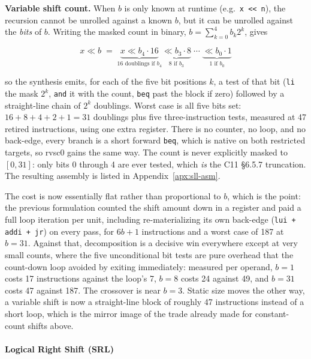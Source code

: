 \textbf{Variable shift count.} When $b$ is only known at runtime (e.g.\ \texttt{x << n}), the
recursion cannot be unrolled against a known $b$, but it can be unrolled against the \textit{bits}
of $b$. Writing the masked count in binary, $b = \sum_{k=0}^{4} b_k 2^k$, gives

\begin{equation*}
x \ll b \;=\;
  \underbrace{x \ll b_4 \cdot 16}_{\text{16 doublings if } b_4}
  \underbrace{\ll b_3 \cdot 8}_{\text{8 if } b_3}
  \;\cdots\;
  \underbrace{\ll b_0 \cdot 1}_{\text{1 if } b_0}
\end{equation*}

so the synthesis emits, for each of the five bit positions $k$, a test of that bit (\texttt{li} the
mask $2^k$, \texttt{and} it with the count, \texttt{beq} past the block if zero) followed by a
straight-line chain of $2^k$ doublings. Worst case is all five bits set: $16 + 8 + 4 + 2 + 1 = 31$
doublings plus five three-instruction tests, measured at 47 retired instructions, using one extra
register. There is no counter, no loop, and no back-edge, every branch is a short forward
\texttt{beq}, which is native on both restricted targets, so rvsc0 gains the same way. The count is
never explicitly masked to $[0, 31]$: only bits 0 through 4 are ever tested, which \textit{is} the
C11 \S6.5.7 truncation. The resulting assembly is listed in Appendix~\ref{apx:sll-asm}.

The cost is now essentially flat rather than proportional to $b$, which is the point: the previous
formulation counted the shift amount down in a register and paid a full loop iteration per unit,
including re-materializing its own back-edge (\texttt{lui + addi + jr}) on every pass, for $6b + 1$
instructions and a worst case of 187 at $b = 31$. Against that, decomposition is a decisive win
everywhere except at very small counts, where the five unconditional bit tests are pure overhead that
the count-down loop avoided by exiting immediately: measured per operand, $b = 1$ costs 17
instructions against the loop's 7, $b = 8$ costs 24 against 49, and $b = 31$ costs 47 against 187.
The crossover is near $b = 3$. Static size moves the other way, a  variable shift is now a
straight-line block of roughly 47 instructions instead of a short loop, which is the mirror image
of the trade already made for constant-count shifts above.

\paragraph{Logical Right Shift (SRL)} \label{sec:sc1-srl}

